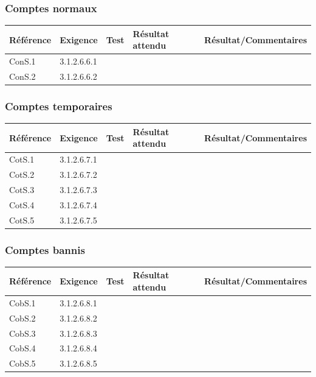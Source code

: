 \documentclass[10pt,a4paper,landscape]{report}
\begin{document}
\subsubsection{Comptes normaux}
\begin{center}
	\bgroup
	\def\arraystretch{1.5}
	\begin{tabular}{|p{1.5cm}|p{2cm}|p{8.5cm}|p{8.5cm}|p{5cm}|}
		\hline
		\rowcolor{gris}Référence & Exigence & Test & Résultat attendu & Résultat/Commentaires\\
		\hline
		ConS.1 & 3.1.2.6.6.1 & & & \\
		\hline
		ConS.2 & 3.1.2.6.6.2 & & & \\
		\hline
	\end{tabular}
	\egroup
\end{center}

\subsubsection{Comptes temporaires}
\begin{center}
	\bgroup
	\def\arraystretch{1.5}
	\begin{tabular}{|p{1.5cm}|p{2cm}|p{8.5cm}|p{8.5cm}|p{5cm}|}
		\hline
		\rowcolor{gris}Référence & Exigence & Test & Résultat attendu & Résultat/Commentaires\\
		\hline
		CotS.1 & 3.1.2.6.7.1 & & & \\
		\hline
		CotS.2 & 3.1.2.6.7.2 & & & \\
		\hline
		CotS.3 & 3.1.2.6.7.3 & & & \\
		\hline
		CotS.4 & 3.1.2.6.7.4 & & & \\
		\hline
		CotS.5 & 3.1.2.6.7.5 & & & \\
		\hline
	\end{tabular}
	\egroup
\end{center}

\subsubsection{Comptes bannis}
\begin{center}
	\bgroup
	\def\arraystretch{1.5}
	\begin{tabular}{|p{1.5cm}|p{2cm}|p{8.5cm}|p{8.5cm}|p{5cm}|}
		\hline
		\rowcolor{gris}Référence & Exigence & Test & Résultat attendu & Résultat/Commentaires\\
		\hline
		CobS.1 & 3.1.2.6.8.1 & & & \\
		\hline
		CobS.2 & 3.1.2.6.8.2 & & & \\
		\hline
		CobS.3 & 3.1.2.6.8.3 & & & \\
		\hline
		CobS.4 & 3.1.2.6.8.4 & & & \\
		\hline
		CobS.5 & 3.1.2.6.8.5 & & & \\
		\hline
	\end{tabular}
	\egroup
\end{center}
\end{document}
